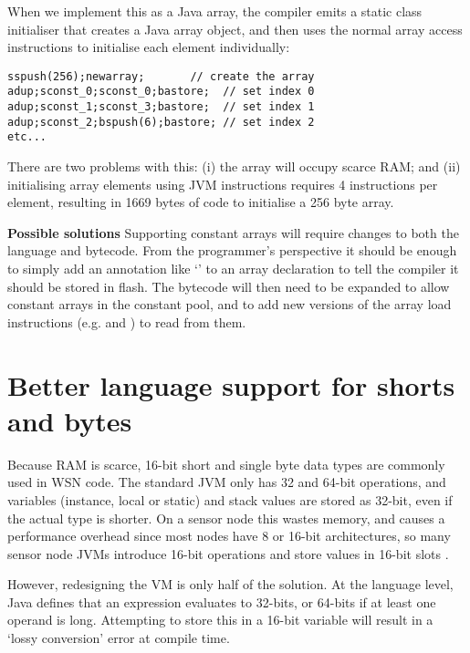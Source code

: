 When we implement this as a  Java array, the compiler emits a static class initialiser that creates a Java array object, and then uses the normal array access instructions to initialise each element individually:
\begin{verbatim}
sspush(256);newarray;       // create the array
adup;sconst_0;sconst_0;bastore;  // set index 0
adup;sconst_1;sconst_3;bastore;  // set index 1
adup;sconst_2;bspush(6);bastore; // set index 2
etc...
\end{verbatim}


There are two problems with this: (i) the array will occupy scarce RAM; and (ii) initialising array elements using JVM instructions requires 4 instructions per element, resulting in 1669 bytes of code to initialise a 256 byte array.

% 

\textbf{Possible solutions}
Supporting constant arrays will require changes to both the language and bytecode. From the programmer's perspective it should be enough to simply add an annotation like `' to an array declaration to tell the compiler it should be stored in flash. The bytecode will then need to be expanded to allow constant arrays in the constant pool, and to add new versions of the array load instructions (e.g.  and ) to read from them.



\section{Better language support for shorts and bytes}
\label{sec-small-datatypes}
Because RAM is scarce, 16-bit short and single byte data types are commonly used in WSN code. The standard JVM only has 32 and 64-bit operations, and variables (instance, local or static) and stack values are stored as 32-bit, even if the actual type is shorter. On a sensor node this wastes memory, and causes a performance overhead since most nodes have 8 or 16-bit architectures, so many sensor node JVMs introduce 16-bit operations and store values in 16-bit slots \cite{Brouwers:2009cj}.

However, redesigning the VM is only half of the solution. At the language level, Java defines that an expression evaluates to 32-bits, or 64-bits if at least one operand is long. Attempting to store this in a 16-bit variable will result in a `lossy conversion' error at compile time.


